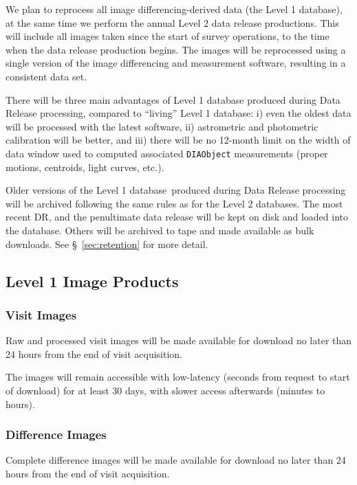 \documentclass[12pt]{article}
\newcommand{\code}[1]{\texttt{#1}}
\newcommand{\DIAObject}{\code{DIAObject}\xspace}
\newcommand{\DB}{{Level 1 database}\xspace}
\newcommand{\DR}{{Level 2 database}\xspace}
\begin{document}
\vspace{1em}

We plan to reprocess all image differencing-derived data (the \DB), at the same time we perform the annual Level 2 data release productions. This will include all images taken since the start of survey operations, to the time when the data release production begins. The images will be reprocessed using a single version of the image differencing and measurement software, resulting in a consistent data set.

There will be three main advantages of \DB produced during Data Release processing, compared to
``living'' \DB:
i) even the oldest data will be processed with the latest software,
ii) astrometric and photometric calibration will be better, and
iii) there will be no 12-month limit on the width of data window used to computed associated \DIAObject
measurements (proper motions, centroids, light curves, etc.).

Older versions of the \DB\ produced during Data Release processing will be archived following the same rules as for the \DR{}s. The most recent DR, and the penultimate data release will be kept on disk and loaded into the database. Others will be archived to tape and made available as bulk downloads. See \S~\ref{sec:retention} for more detail.

\subsection{Level 1 Image Products}

\subsubsection{Visit Images}

Raw and processed visit images will be made available for download no later than 24 hours from the end of visit acquisition.

The images will remain accessible with low-latency (seconds from request to start of download) for at least 30 days, with slower access afterwards (minutes to hours).

\subsubsection{Difference Images}
\label{sec:diffims}

Complete difference images will be made available for download no later than 24 hours from the end of visit acquisition.
\end{document}
